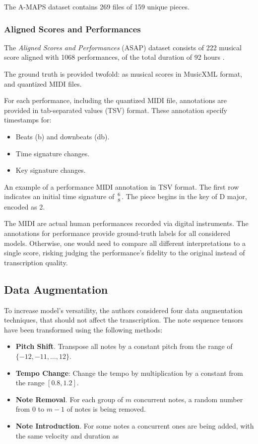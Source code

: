 The A-MAPS dataset contains 269 files of 159 unique pieces.

\subsubsection{Aligned Scores and Performances}

The \emph{Aligned Scores and Performances} (ASAP) dataset consists of 222 musical score aligned with 1068 performances, of the total duration of 92 hours \cite{Foscarin2020}.

The ground truth is provided twofold: as musical scores in MusicXML format, and quantized MIDI files.

For each performance, including the quantized MIDI file, annotations are provided in tab-separated values (TSV) format. These annotation specify timestamps for: \begin{itemize}
	\item Beats (b) and downbeats (db).
	\item Time signature changes.
	\item Key signature changes.
\end{itemize}

\begin{table}[ht!]
\centering

\caption[Example of performance MIDI annotation in TSV format]{An example of a performance MIDI annotation in TSV format. The first row indicates an initial time signature of ${6 \atop 8}$. The piece begins in the key of D major, encoded as 2.}
\end{table}

The MIDI are actual human performances recorded via digital instruments. The annotations for performance provide ground-truth labels for all considered models. Otherwise, one would need to compare all different interpretations to a single score, risking judging the performance's fidelity to the original instead of transcription quality.

\subsection{Data Augmentation}

To increase model's versatility, the authors considered four data augmentation techniques, that should not affect the transcription. The note sequence tensors have been transformed using the following methods: \begin{itemize}
	\item \textbf{Pitch Shift}. Transpose all notes by a constant pitch from the range of $\{-12, -11, \ldots, 12\}$.
	\item \textbf{Tempo Change}: Change the tempo by multiplication by a constant from the range $[0.8, 1.2]$.
	\item \textbf{Note Removal}. For each group of $m$ concurrent notes, a random number from $0$ to $m - 1$ of notes is being removed.
	\item \textbf{Note Introduction}. For some notes a concurrent ones are being added, with the same velocity and duration as 
\end{itemize}

